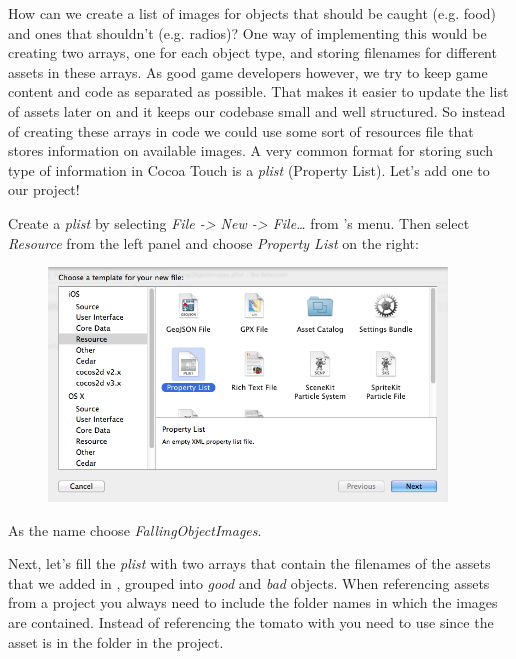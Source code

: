 How can we create a list of images for objects that should be caught (e.g.
food) and ones that shouldn't (e.g. radios)? One way of implementing this would
be creating two arrays, one for each object type, and storing filenames for 
different assets in these arrays. As good game developers however, we try to
keep game content and code as separated as possible. That makes it easier to
update the list of assets later on and it keeps our codebase small and well
structured. So instead of creating these arrays in code we could use some sort
of resources file that stores information on available images. A very common 
format for storing such type of information in Cocoa Touch is a \textit{plist} 
(Property List). Let's add one to our project!

\begin{leftbar}
Create a \textit{plist} by selecting \textit{File ->
New -> File\ldots} from \xcode{}'s menu. 
Then select \textit{Resource} from the left panel and choose
\textit{Property List} on the right:

\begin{figure}[H]
    \centering
    \includegraphics[width=300pt]{images/Chapter2/create_plist.png}
\end{figure}

As the name choose \textit{FallingObjectImages}.
\end{leftbar} 

Next, let's fill the \textit{plist} with two arrays that contain the filenames
of the assets that we added in \SB{}, grouped into \textit{good} and
\textit{bad} objects. When referencing assets from a \SB{} project you always
need to include the folder names in which the images are contained. Instead of
referencing the tomato with  you need to use  since the asset is in the
 folder in the \SB{} project.

